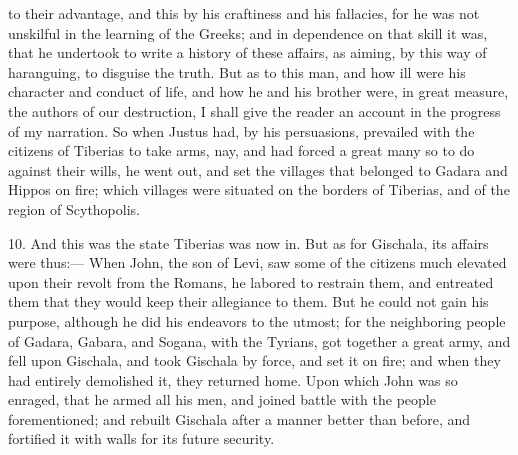 to their advantage, and this by his craftiness and his fallacies, for he
was not unskilful in the learning of the Greeks; and in dependence on that
skill it was, that he undertook to write a history of these affairs, as
aiming, by this way of haranguing, to disguise the truth. But as to this
man, and how ill were his character and conduct of life, and how he and
his brother were, in great measure, the authors of our destruction, I
shall give the reader an account in the progress of my narration. So when
Justus had, by his persuasions, prevailed with the citizens of Tiberias to
take arms, nay, and had forced a great many so to do against their wills,
he went out, and set the villages that belonged to Gadara and Hippos on
fire; which villages were situated on the borders of Tiberias, and of the
region of Scythopolis.

10. And this was the state Tiberias was now in. But as for Gischala, its
affairs were thus:— When John, the son of Levi, saw some of the
citizens much elevated upon their revolt from the Romans, he labored to
restrain them, and entreated them that they would keep their allegiance to
them. But he could not gain his purpose, although he did his endeavors to
the utmost; for the neighboring people of Gadara, Gabara, and Sogana, with
the Tyrians, got together a great army, and fell upon Gischala, and took
Gischala by force, and set it on fire; and when they had entirely
demolished it, they returned home. Upon which John was so enraged, that he
armed all his men, and joined battle with the people forementioned; and
rebuilt Gischala after a manner better than before, and fortified it with
walls for its future security.


